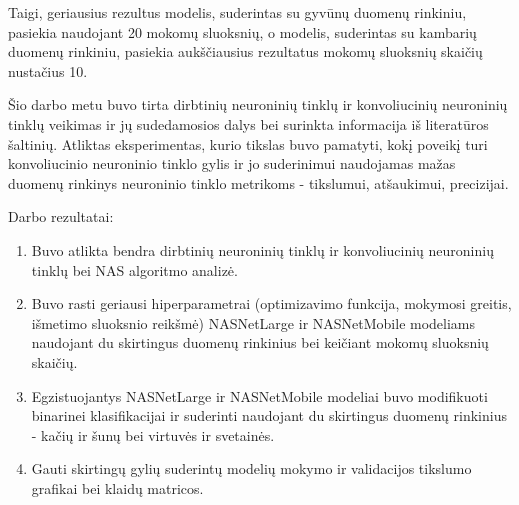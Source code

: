 \documentclass{VUMIFPSbakalaurinis}
\begin{document}
Taigi, geriausius rezultus modelis, suderintas su gyvūnų duomenų rinkiniu, pasiekia naudojant 20 mokomų sluoksnių, o modelis, suderintas su kambarių duomenų rinkiniu, pasiekia aukščiausius rezultatus mokomų sluoksnių skaičių nustačius 10.

Šio darbo metu buvo tirta dirbtinių neuroninių tinklų ir konvoliucinių neuroninių tinklų veikimas 
ir jų sudedamosios dalys bei surinkta informacija iš literatūros šaltinių. Atliktas eksperimentas, 
kurio tikslas buvo pamatyti, kokį poveikį turi konvoliucinio neuroninio tinklo gylis ir jo suderinimui 
naudojamas mažas duomenų rinkinys neuroninio tinklo metrikoms - tikslumui, atšaukimui, precizijai.

Darbo rezultatai:
\begin{enumerate}
    \item Buvo atlikta bendra dirbtinių neuroninių tinklų ir konvoliucinių neuroninių tinklų bei NAS algoritmo analizė.
    \item Buvo rasti geriausi hiperparametrai (optimizavimo funkcija, mokymosi greitis, išmetimo sluoksnio reikšmė) NASNetLarge ir NASNetMobile modeliams naudojant du skirtingus duomenų rinkinius bei keičiant mokomų sluoksnių skaičių.
    \item Egzistuojantys NASNetLarge ir NASNetMobile modeliai buvo modifikuoti binarinei klasifikacijai ir suderinti naudojant du skirtingus duomenų rinkinius - kačių ir šunų bei virtuvės ir svetainės.
    \item Gauti skirtingų gylių suderintų modelių mokymo ir validacijos tikslumo grafikai bei klaidų matricos.
\end{enumerate}
\end{document}
